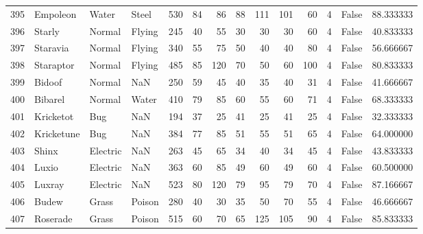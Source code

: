 \begin{tabular}{rlllrrrrrrrrlr}
 395 &                   Empoleon &     Water &     Steel &    530 &   84 &      86 &       88 &      111 &      101 &     60 &           4 &      False &   88.333333 \\
 396 &                     Starly &    Normal &    Flying &    245 &   40 &      55 &       30 &       30 &       30 &     60 &           4 &      False &   40.833333 \\
 397 &                   Staravia &    Normal &    Flying &    340 &   55 &      75 &       50 &       40 &       40 &     80 &           4 &      False &   56.666667 \\
 398 &                  Staraptor &    Normal &    Flying &    485 &   85 &     120 &       70 &       50 &       60 &    100 &           4 &      False &   80.833333 \\
 399 &                     Bidoof &    Normal &       NaN &    250 &   59 &      45 &       40 &       35 &       40 &     31 &           4 &      False &   41.666667 \\
 400 &                    Bibarel &    Normal &     Water &    410 &   79 &      85 &       60 &       55 &       60 &     71 &           4 &      False &   68.333333 \\
 401 &                  Kricketot &       Bug &       NaN &    194 &   37 &      25 &       41 &       25 &       41 &     25 &           4 &      False &   32.333333 \\
 402 &                 Kricketune &       Bug &       NaN &    384 &   77 &      85 &       51 &       55 &       51 &     65 &           4 &      False &   64.000000 \\
 403 &                      Shinx &  Electric &       NaN &    263 &   45 &      65 &       34 &       40 &       34 &     45 &           4 &      False &   43.833333 \\
 404 &                      Luxio &  Electric &       NaN &    363 &   60 &      85 &       49 &       60 &       49 &     60 &           4 &      False &   60.500000 \\
 405 &                     Luxray &  Electric &       NaN &    523 &   80 &     120 &       79 &       95 &       79 &     70 &           4 &      False &   87.166667 \\
 406 &                      Budew &     Grass &    Poison &    280 &   40 &      30 &       35 &       50 &       70 &     55 &           4 &      False &   46.666667 \\
 407 &                   Roserade &     Grass &    Poison &    515 &   60 &      70 &       65 &      125 &      105 &     90 &           4 &      False &   85.833333 \\

\end{tabular}
